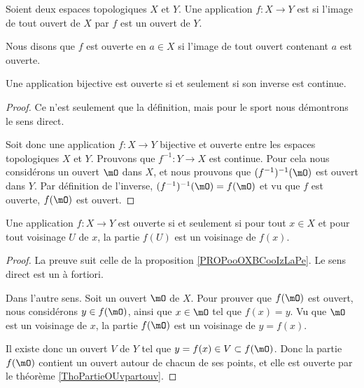 \begin{definition}
	Soient deux espaces topologiques \( X\) et \( Y\). Une application \( f\colon X\to Y\) est  si l'image de tout ouvert de \( X\) par \( f\) est un ouvert de \( Y\).

	Nous disons que \( f\) est ouverte en \( a\in X\) si l'image de tout ouvert contenant \( a\) est ouverte.
\end{definition}

\begin{proposition}     \label{PROPooXGEGooHoMsne}
	Une application bijective est ouverte si et seulement si son inverse est continue.
\end{proposition}

\begin{proof}
	Ce n'est seulement que la définition, mais pour le sport nous démontrons le sens direct.

	Soit donc une application \( f\colon X\to Y\) bijective et ouverte entre les espaces topologiques \( X\) et \( Y\). Prouvons que \( f^{-1}\colon Y\to X\) est continue. Pour cela nous considérons un ouvert \( \mO\) dans \( X\), et nous prouvons que \( (f^{-1})^{-1}(\mO)\) est ouvert dans \( Y\). Par définition de l'inverse, \( (f^{-1})^{-1}(\mO)=f(\mO)\) et vu que \( f\) est ouverte, \( f(\mO)\) est ouvert.
\end{proof}

\begin{lemma}       \label{LEMooHHIPooEpGfCg}
	Une application \( f\colon X\to Y\) est ouverte si et seulement si pour tout \( x\in X\) et pour tout voisinage \( U\) de \( x\), la partie \( f(U)\) est un voisinage de \( f(x)\).
\end{lemma}

\begin{proof}
	La preuve suit celle de la proposition \ref{PROPooOXBCooIzLaPe}. Le sens direct est un à fortiori.

	Dans l'autre sens. Soit un ouvert \( \mO\) de \( X\). Pour prouver que \( f(\mO)\) est ouvert, nous considérons \( y\in f(\mO)\), ainsi que \( x\in\mO\) tel que \( f(x)=y\). Vu que \( \mO\) est un voisinage de \( x\), la partie \( f(\mO)\) est un voisinage de \( y=f(x)\).

	Il existe donc un ouvert \( V\) de \( Y\) tel que \( y=f(x)\in V\subset f(\mO)\). Donc la partie \( f(\mO)\) contient un ouvert autour de chacun de ses points, et elle est ouverte par le théorème \ref{ThoPartieOUvpartouv}.
\end{proof}


